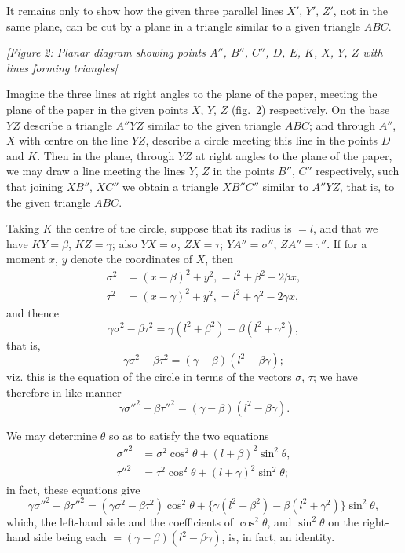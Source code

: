 \documentclass[11pt,a4paper]{article}
\theoremstyle{plain}
\theoremstyle{definition}
\theoremstyle{remark}
\begin{document}
It remains only to show how the given three parallel lines $X'$, $Y'$, $Z'$, not in the same plane, can be cut by a plane in a triangle similar to a given triangle $ABC$.

\begin{center}
\textit{[Figure 2: Planar diagram showing points $A''$, $B''$, $C''$, $D$, $E$, $K$, $X$, $Y$, $Z$ with lines forming triangles]}
\end{center}

Imagine the three lines at right angles to the plane of the paper, meeting the plane of the paper in the given points $X$, $Y$, $Z$ (fig.~2) respectively. On the base $YZ$ describe a triangle $A''YZ$ similar to the given triangle $ABC$; and through $A''$, $X$ with centre on the line $YZ$, describe a circle meeting this line in the points $D$ and $K$. Then in the plane, through $YZ$ at right angles to the plane of the paper, we may draw a line meeting the lines $Y$, $Z$ in the points $B''$, $C''$ respectively, such that joining $XB''$, $XC''$ we obtain a triangle $XB''C''$ similar to $A''YZ$, that is, to the given triangle $ABC$.

Taking $K$ the centre of the circle, suppose that its radius is $= l$, and that we have $KY = \beta$, $KZ = \gamma$; also $YX = \sigma$, $ZX = \tau$; $YA'' = \sigma''$, $ZA'' = \tau''$. If for a moment $x$, $y$ denote the coordinates of $X$, then
\begin{align*}
\sigma^2 &= (x-\beta)^2 + y^2, = l^2 + \beta^2 - 2\beta x,\\
\tau^2 &= (x-\gamma)^2 + y^2, = l^2 + \gamma^2 - 2\gamma x,
\end{align*}
and thence
\[
\gamma\sigma^2 - \beta\tau^2 = \gamma(l^2 + \beta^2) - \beta(l^2 + \gamma^2),
\]
that is,
\[
\gamma\sigma^2 - \beta\tau^2 = (\gamma - \beta)(l^2 - \beta\gamma);
\]
viz. this is the equation of the circle in terms of the vectors $\sigma$, $\tau$; we have therefore in like manner
\[
\gamma\sigma''^2 - \beta\tau''^2 = (\gamma - \beta)(l^2 - \beta\gamma).
\]

We may determine $\theta$ so as to satisfy the two equations
\begin{align*}
\sigma''^2 &= \sigma^2 \cos^2\theta + (l + \beta)^2 \sin^2\theta,\\
\tau''^2 &= \tau^2 \cos^2\theta + (l + \gamma)^2 \sin^2\theta;
\end{align*}
in fact, these equations give
\[
\gamma\sigma''^2 - \beta\tau''^2 = (\gamma\sigma^2 - \beta\tau^2)\cos^2\theta + \{\gamma(l^2+\beta^2) - \beta(l^2+\gamma^2)\}\sin^2\theta,
\]
which, the left-hand side and the coefficients of $\cos^2\theta$, and $\sin^2\theta$ on the right-hand side being each $= (\gamma-\beta)(l^2-\beta\gamma)$, is, in fact, an identity.
\end{document}
